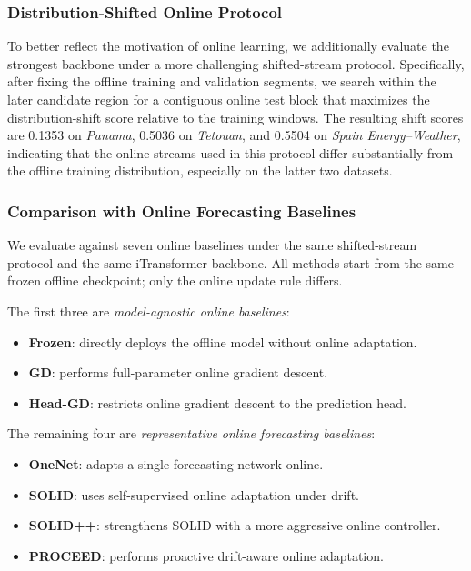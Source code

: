﻿\documentclass[journal]{IEEEtran}
\newenvironment{auditproblemblock}{\begingroup\color{red}}{\endgroup}
\begin{document}
\begin{auditproblemblock}
\subsubsection{Distribution-Shifted Online Protocol}
To better reflect the motivation of online learning, we additionally evaluate the strongest backbone under a more challenging shifted-stream protocol. Specifically, after fixing the offline training and validation segments, we search within the later candidate region for a contiguous online test block that maximizes the distribution-shift score relative to the training windows. The resulting shift scores are 0.1353 on \textit{Panama}, 0.5036 on \textit{Tetouan}, and 0.5504 on \textit{Spain Energy--Weather}, indicating that the online streams used in this protocol differ substantially from the offline training distribution, especially on the latter two datasets.

\subsubsection{Comparison with Online Forecasting Baselines}
We evaluate against seven online baselines under the same shifted-stream protocol and the same iTransformer backbone. All methods start from the same frozen offline checkpoint; only the online update rule differs.

The first three are \emph{model-agnostic online baselines}:
\begin{itemize}
\item \textbf{Frozen}: directly deploys the offline model without online adaptation.
\item \textbf{GD}: performs full-parameter online gradient descent.
\item \textbf{Head-GD}: restricts online gradient descent to the prediction head.
\end{itemize}

The remaining four are \emph{representative online forecasting baselines}:
\begin{itemize}
\item \textbf{OneNet}: adapts a single forecasting network online.
\item \textbf{SOLID}: uses self-supervised online adaptation under drift.
\item \textbf{SOLID++}: strengthens SOLID with a more aggressive online controller.
\item \textbf{PROCEED}: performs proactive drift-aware online adaptation.
\end{itemize}


\end{auditproblemblock}
\end{document}
